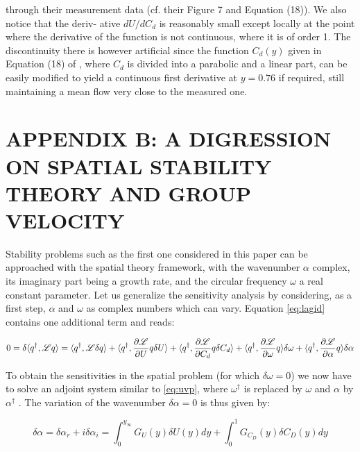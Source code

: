 through their measurement data (cf. their Figure 7 and Equation (18)). We also notice that the deriv-
ative $dU/dC_d$ is reasonably small except locally at the point where the derivative of the function is
not continuous, where it is of order 1. The discontinuity there is however artificial since the function
$C_d(y)$ given in Equation (18) of \cite{ghisalberti2004limited}, where $C_d$ is divided into a parabolic and a
linear part, can be easily modified to yield a continuous first derivative at $y = 0.76$ if required, still
maintaining a mean flow very close to the measured one.

\section*{APPENDIX B: A DIGRESSION ON SPATIAL STABILITY THEORY AND GROUP VELOCITY}

Stability problems such as the first one considered in this paper can be approached with the
spatial theory framework, with the wavenumber $\alpha$ complex, its imaginary part being a growth rate,
and the circular frequency $\omega$ a real constant parameter. Let us generalize the sensitivity analysis by
considering, as a first step, $\alpha$ and $\omega$ as complex numbers which can vary. Equation \ref{eq:lagid} contains one
additional term and reads:

\begin{equation}
0 = \delta \langle q^{\dagger}, \mathscr{L} q \rangle = 
\langle q^{\dagger}, \mathscr{L} \delta q \rangle +
\langle q^{\dagger}, \frac{\partial \mathscr{L}}{\partial U}  q \delta U\rangle +
\langle q^{\dagger}, \frac{\partial \mathscr{L}}{\partial C_d}  q \delta C_d\rangle +
\langle q^{\dagger}, \frac{\partial \mathscr{L}}{\partial \omega}  q \rangle \delta \omega +
\langle q^{\dagger}, \frac{\partial \mathscr{L}}{\partial \alpha}  q \rangle \delta \alpha
\label{eq:lagid_spatial}
\end{equation}

To obtain the sensitivities in the spatial problem (for which $\delta \omega = 0$) we now have to solve an adjoint
system similar to \ref{eq:uvp}, where $\omega^{\dagger}$ is replaced by $\omega$ and $\alpha$ by $\alpha^{\dagger}$ . The variation of the wavenumber  $\delta \alpha = 0$ is thus given by:

$$
\delta \alpha =\delta \alpha_r + i \delta \alpha_i= \int_0^{y_{\infty}}  G_U(y) \delta U(y) dy + \int_0^{1}  G_{C_D}(y) \delta C_D(y) dy
$$

